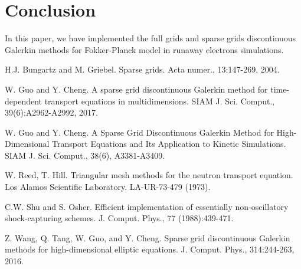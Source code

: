 \documentclass[preprint,11pt]{elsarticle}
\begin{document}
\section{Conclusion}\label{Sect:Con}
In this paper, we have implemented the full grids and sparse grids discontinuous Galerkin methods for Fokker-Planck model in runaway electrons simulations.


\begin{thebibliography}{00}

H.J. Bungartz and M. Griebel. Sparse grids. Acta numer., 13:147-269, 2004.


W. Guo and Y. Cheng. A sparse grid discontinuous Galerkin method for time-dependent transport equations in multidimensions. SIAM J. Sci. Comput., 39(6):A2962-A2992, 2017.

W. Guo and Y. Cheng. A Sparse Grid Discontinuous Galerkin Method for High-Dimensional Transport Equations and Its Application to Kinetic Simulations. SIAM J. Sci. Comput., 38(6), A3381-A3409. 

W. Reed, T. Hill. Triangular mesh methods for the neutron transport equation. Los Alamos Scientific Laboratory. LA-UR-73-479 (1973).

C.W. Shu and S. Osher. Efficient implementation of essentially non-oscillatory shock-capturing schemes. J. Comput.
Phys., 77 (1988):439-471.

Z. Wang, Q. Tang, W. Guo, and Y. Cheng. Sparse grid discontinuous Galerkin methods for high-dimensional elliptic equations. J. Comput. Phys., 314:244-263, 2016.


\end{thebibliography}
\end{document}
